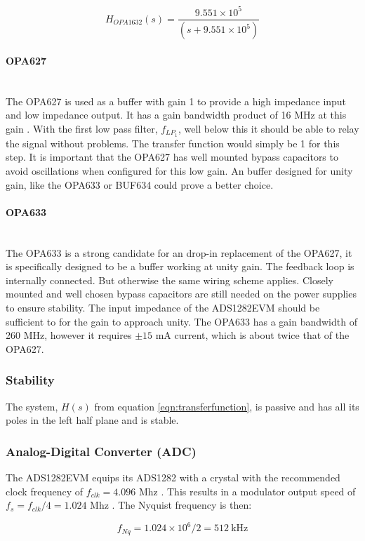 \documentclass[a4paper]{article}
\begin{document}
\begin{multicols}{2}
\begin{equation}
  H_{OPA1632}(s) = \frac{9.551 \times 10^5}
                        {(s + 9.551 \times 10^5)}
  \label{eqn:opa1632_tf}
\end{equation}

\paragraph{OPA627} \ \\
The OPA627 is used as a buffer with gain 1 to provide a high impedance input and low
impedance output. It has a gain bandwidth product of 16 MHz at this
gain \cite{opa627_ds}. With the first low pass filter, $f_{LP_1}$, well
below this it should be able to relay the signal without problems. The
transfer function would simply be 1 for this step. It is important that
the OPA627 has well mounted bypass capacitors to avoid oscillations when
configured for this low gain. An buffer designed for unity gain, like
the OPA633 \cite{opa633_ds} or BUF634 \cite{buf634_ds} could prove a better choice.

\paragraph{OPA633} \ \\
The OPA633 \cite{opa633_ds} is a strong candidate for an drop-in replacement of the
OPA627, it is specifically designed to be a buffer working at unity
gain. The feedback loop is internally connected. But otherwise the same
wiring scheme applies. Closely mounted and well chosen bypass capacitors
are still needed on the power supplies to ensure stability. The input
impedance of the ADS1282EVM should be sufficient to for the gain to
approach unity. The OPA633 has a gain bandwidth of 260 MHz, however it
requires $\pm 15$ mA current, which is about twice that of the OPA627.

\subsubsection{Stability}
The system, $H(s)$ from equation \eqref{eqn:transferfunction}, is
passive and has all
its poles in the left half plane and is stable.

\subsubsection{Analog-Digital Converter (ADC)}
The ADS1282EVM equips its ADS1282 with a crystal with the recommended clock frequency of
$f_{clk} = 4.096$ Mhz \cite{ads1282evm_ds}. This results in a modulator
output speed of $ f_s = f_{clk}/4 = 1.024$ Mhz \cite{ads1282_ds}. The
Nyquist frequency is then:

\begin{equation}
  f_{Nq} = 1.024 \times 10^6 / 2 = 512\ \text{kHz}
  \label{eqn:nyquist}
\end{equation}

\end{multicols}
\end{document}
